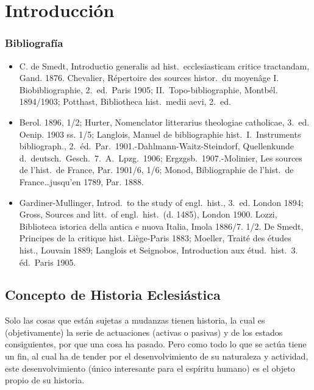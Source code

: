 \raggedbottom{} \documentclass[12pt, a4paper]{book}
\begin{document}
\chapter{Introducción}
\subsection{Bibliografía}
\begin{itemize}
  \item C. de Smedt, Introductio generalis ad hist.\ ecclesiasticam critice tractandam, Gand. 1876. Chevalier, Répertoire des sources histor.\ du moyenâge I. Biobibliographie, 2.\ ed.\ Paris 1905; II.\ Topo-bibliographie, Montbél. 1894/1903; Potthast, Bibliotheca hist.\ medii aevi, 2.\ ed.
  \item Berol. 1896, 1/2; Hurter, Nomenclator litterarius theologiae catholicae, 3.\ ed. Oenip. 1903 ss. 1/5; Langlois, Manuel de bibliographie hist.\ I.\ Instruments bibliograph., 2.\ éd.\ Par.\ 1901.-Dahlmann-Waitz-Steindorf, Quellenkunde d.\ deutsch.\ Gesch.\ 7.\ A.\ Lpzg.\ 1906; Ergzgsb.\ 1907.-Molinier, Les sources de l'hist.\ de France, Par. 1901/6, 1/6; Monod, Bibliographie de l'hist.\ de France\ldots jusqu'en 1789, Par. 1888.
  \item Gardiner-Mullinger, Introd.\ to the study of engl.\ hist., 3.\ ed. London 1894; Gross, Sources and litt.\ of engl.\ hist.\ (d. 1485), London 1900. Lozzi, Biblioteca istorica della antica e nuova Italia, Imola 1886/7. 1/2. De Smedt, Principes de la critique hist. Liège-Paris 1883; Moeller, Traité des études hist., Louvain 1889; Langlois et Seignobos, Introduction aux étud.\ hist.\ 3. éd.\ Paris 1905.
\end{itemize}
\section{Concepto de Historia Eclesiástica}
Solo las cosas que están sujetas a mudanzas tienen historia, la cual es (objetivamente) la serie de actuaciones (activas o pasivas) y de los estados consiguientes, por que una cosa ha pasado. Pero como todo lo que se actúa tiene un fin, al cual ha de tender por el desenvolvimiento de su naturaleza y actividad, este desenvolvimiento (único interesante para el espíritu humano) es el objeto propio de su historia.
\end{document}
